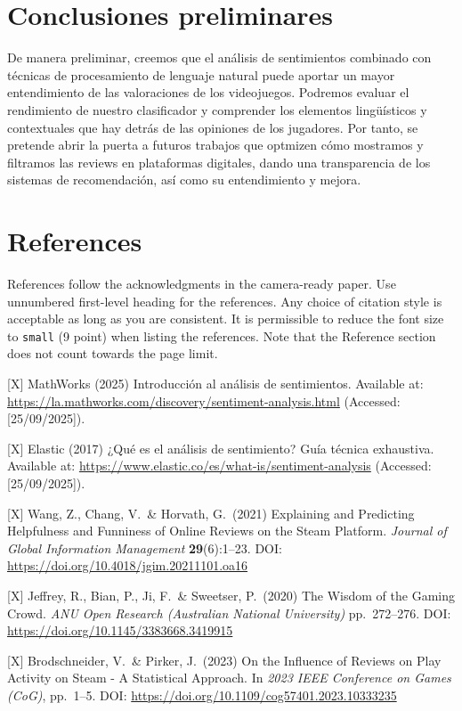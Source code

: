 \documentclass{article}
\begin{document}
\section{Conclusiones preliminares}
De manera preliminar, creemos que el análisis de sentimientos combinado con técnicas de procesamiento de lenguaje natural puede aportar un mayor entendimiento de las valoraciones de los videojuegos. Podremos evaluar el rendimiento de nuestro clasificador y comprender los elementos lingüísticos y contextuales que hay detrás de las opiniones de los jugadores. Por tanto, se pretende abrir la puerta a futuros trabajos que optmizen cómo mostramos y filtramos las reviews en plataformas digitales, dando una transparencia de los sistemas de recomendación, así como su entendimiento y mejora.

\section*{References}


References follow the acknowledgments in the camera-ready paper. Use unnumbered first-level heading for
the references. Any choice of citation style is acceptable as long as you are
consistent. It is permissible to reduce the font size to \verb+small+ (9 point)
when listing the references.
Note that the Reference section does not count towards the page limit.
\medskip


{
\small

[X] MathWorks (2025) Introducción al análisis de sentimientos. Available at: 
\url{https://la.mathworks.com/discovery/sentiment-analysis.html} 
(Accessed: [25/09/2025]).

[X] Elastic (2017) ¿Qué es el análisis de sentimiento? Guía técnica exhaustiva. 
Available at: \url{https://www.elastic.co/es/what-is/sentiment-analysis} 
(Accessed: [25/09/2025]).

[X] Wang, Z., Chang, V.\ \& Horvath, G.\ (2021) Explaining and Predicting 
Helpfulness and Funniness of Online Reviews on the Steam Platform. 
{\it Journal of Global Information Management} {\bf 29}(6):1--23. 
DOI: \url{https://doi.org/10.4018/jgim.20211101.oa16}

[X] Jeffrey, R., Bian, P., Ji, F.\ \& Sweetser, P.\ (2020) The Wisdom of the 
Gaming Crowd. {\it ANU Open Research (Australian National University)} 
pp.\ 272--276. DOI: \url{https://doi.org/10.1145/3383668.3419915}

[X] Brodschneider, V.\ \& Pirker, J.\ (2023) On the Influence of Reviews on 
Play Activity on Steam - A Statistical Approach. In {\it 2023 IEEE Conference 
on Games (CoG)}, pp.\ 1--5. DOI: \url{https://doi.org/10.1109/cog57401.2023.10333235}



}
\end{document}
